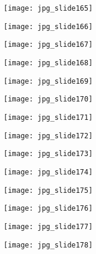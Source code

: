 \documentclass[main.tex]{subfiles}
\begin{document}
\begin{center}
\texttt{[image: jpg\_slide165]}
\end{center}

\begin{center}
\texttt{[image: jpg\_slide166]}
\end{center}

\begin{center}
\texttt{[image: jpg\_slide167]}
\end{center}

\begin{center}
\texttt{[image: jpg\_slide168]}
\end{center}

\begin{center}
\texttt{[image: jpg\_slide169]}
\end{center}

\begin{center}
\texttt{[image: jpg\_slide170]}
\end{center}

\begin{center}
\texttt{[image: jpg\_slide171]}
\end{center}

\begin{center}
\texttt{[image: jpg\_slide172]}
\end{center}

\begin{center}
\texttt{[image: jpg\_slide173]}
\end{center}

\begin{center}
\texttt{[image: jpg\_slide174]}
\end{center}

\begin{center}
\texttt{[image: jpg\_slide175]}
\end{center}

\begin{center}
\texttt{[image: jpg\_slide176]}
\end{center}

\begin{center}
\texttt{[image: jpg\_slide177]}
\end{center}

\begin{center}
\texttt{[image: jpg\_slide178]}
\end{center}
\end{document}
